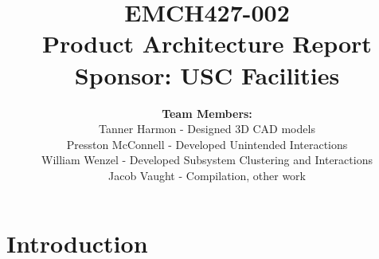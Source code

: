 \documentclass[12pt]{article}
\begin{document}
\title{
    \vspace{2in}
    \textbf{EMCH427-002} \\[1ex]
    \textbf{Product Architecture Report} \\[1ex]
    \textbf{Sponsor: USC Facilities} \\[1ex]
    \vspace{2in}
}

\author{
    \textbf{Team Members:} \\[2ex]
    Tanner Harmon - Designed 3D CAD models\\[1ex]
    Presston McConnell - Developed Unintended Interactions\\[1ex]
    William Wenzel - Developed Subsystem Clustering and Interactions\\[1ex]
    Jacob Vaught - Compilation, other work\\[2ex]
}

\date{}

\maketitle
\thispagestyle{fancy}

\newpage

\section{Introduction}
\label{sec:introduction}
\end{document}

